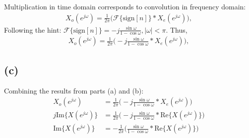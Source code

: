 \documentclass{article}
\begin{document}
Multiplication in time domain corresponds to convolution in frequency domain:
\begin{align}
X_o(e^{j\omega}) = \frac{1}{2\pi}\Big(\mathcal{F}\{\mathrm{sign}[n]\}\ast X_e(e^{j\omega})\Big),
\end{align}
Following the hint: $\mathcal{F}\{\mathrm{sign}[n]\} = -j\frac{\sin\omega}{1-\cos\omega}, |\omega| < \pi$. Thus, 
\begin{align}
X_o(e^{j\omega}) = \frac{1}{2\pi}\Big(-j\frac{\sin\omega}{1-\cos\omega}\ast X_e(e^{j\omega})\Big),
\end{align}

\subsection{(c)}

Combining the results from parts (a) and (b):
\begin{align}
X_o(e^{j\omega}) &= \frac{1}{2\pi}\Big(-j\frac{\sin\omega}{1-\cos\omega}\ast X_e(e^{j\omega})\Big) \tag{from part (b)} \\
j\mathrm{Im}\{X(e^{j\omega})\} &= \frac{1}{2\pi}\Big(-j\frac{\sin\omega}{1-\cos\omega}\ast \mathrm{Re}\{X(e^{j\omega})\}\Big) \tag{from part (a)} \\
\mathrm{Im}\{X(e^{j\omega})\} &= -\frac{1}{2\pi}\Big(\frac{\sin\omega}{1-\cos\omega}\ast \mathrm{Re}\{X(e^{j\omega})\}\Big)
\end{align}
\end{document}
